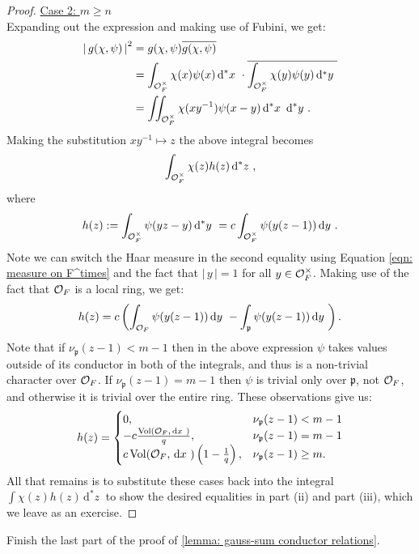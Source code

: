 \documentclass[11pt, x11names, openany]{book}
\newcommand{\pp}{\mathfrak{p}}
\renewcommand{\bar}[1]{\overline{#1}}
\renewcommand{\brack}[1]{\left(   #1 \right)}
\newcommand{\abs}[1]{\left| \, #1  \,\right|}
\newcommand{\inv}[1]{#1^{-1}}
\newcommand{\dx}{\, \mathrm{d}x \ }
\newcommand{\dy}{\, \mathrm{d}y \ }
\renewcommand{\d}[1]{\, \mathrm{d}#1 \ }
\DeclareMathOperator{\vol}{Vol}
\begin{document}
\begin{proof}
\underline{Case 2: $m \geq n$}\\
Expanding out the expression and making use of Fubini, we get:
\begin{align*}
    \abs{g(\chi, \psi)}^2 &= g(\chi, \psi) \bar{g(\chi, \psi)}\\
    &= \int_{\calo_F^\times} \chi(x) \psi(x) \d{^*x} \cdot \bar{\int_{\calo_F^\times} \chi(y) \psi(y) \d{^*y}}\\
    &= \iint_{\calo_F^\times} \chi(x\inv{y})\psi(x-y)  \d{^*x} \d{^*y}.
\end{align*}
Making the substitution $x\inv{y} \mapsto z$ the above integral becomes
\begin{equation*}
    \int_{\calo_F^\times} \chi(z) h(z) \d{^*z},
\end{equation*}
where 
\begin{equation*}
    h(z) := \int_{\calo_F^\times} \psi(yz - y)\d{^*y} = c \int_{\calo_F^\times} \psi(y(z-1)) \dy.
\end{equation*}
Note we can switch the Haar measure in the second equality using Equation \ref{eqn: measure on F^times} and the fact that $\abs{y} = 1$ for all $y \in \mathcal{O}_F^\times$. Making use of the fact that $\mathcal{O}_F$ is a local ring, we get:
\begin{equation*}
    h(z) = c \brack{\int_{\calo_F} \psi(y(z - 1)) \dy - \int_\pp \psi(y(z - 1)) \dy}.
\end{equation*}
Note that if $\nu_\pp(z-1)  <  m-1$ then in the above expression $\psi$ takes values outside of its conductor in both of the integrals, and thus is a non-trivial character over $\mathcal{O}_F$. If $\nu_\pp(z-1) = m - 1$ then $\psi$ is trivial only over $\pp$, not $\mathcal{O}_F$, and otherwise it is trivial over the entire ring. These observations give us:
\begin{equation*}
    h(z) = \begin{cases}
        0, & \nu_\pp(z-1) < m-1\\
        -c\frac{\vol(\calo_F, \dx)}{q}, & \nu_\pp(z-1) = m-1\\
        c\vol(\calo_F, \dx)\brack{1 - \frac{1}{q}}, &   \nu_\pp(z-1) \geq m.
    \end{cases}
\end{equation*}
All that remains is to substitute these cases back into the integral $\int \chi(z)h(z) \d{^*z}$ to show the desired equalities in part (ii) and part (iii), which we leave as an exercise.
\end{proof}


\begin{exercise}
\label{exercise: last part of gauss-sum conductor proof}
Finish the last part of the proof of \ref{lemma: gauss-sum conductor relations}.
\end{exercise}
\end{document}
